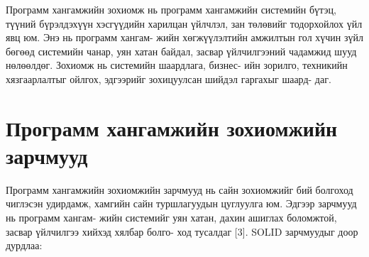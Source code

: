 Программ хангамжийн зохиомж нь программ хангамжийн системийн бүтэц, түүний бүрэлдэхүүн хэсгүүдийн харилцан үйлчлэл, зан төлөвийг тодорхойлох үйл явц юм. Энэ нь программ хангам- жийн хөгжүүлэлтийн амжилтын гол хүчин зүйл бөгөөд системийн чанар, уян хатан байдал, засвар үйлчилгээний чадамжид шууд нөлөөлдөг. Зохиомж нь системийн шаардлага, бизнес- ийн зорилго, техникийн хязгаарлалтыг ойлгох, эдгээрийг зохицуулсан шийдэл гаргахыг шаард- даг.
\section{Программ хангамжийн зохиомжийн зарчмууд}
Программ хангамжийн зохиомжийн зарчмууд нь сайн зохиомжийг бий болгоход чиглэсэн удирдамж, хамгийн сайн туршлагуудын цуглуулга юм. Эдгээр зарчмууд нь программ хангам- жийн системийг уян хатан, дахин ашиглах боломжтой, засвар үйлчилгээ хийхэд хялбар болго- ход тусалдаг [3]. SOLID зарчмуудыг доор дурдлаа:
